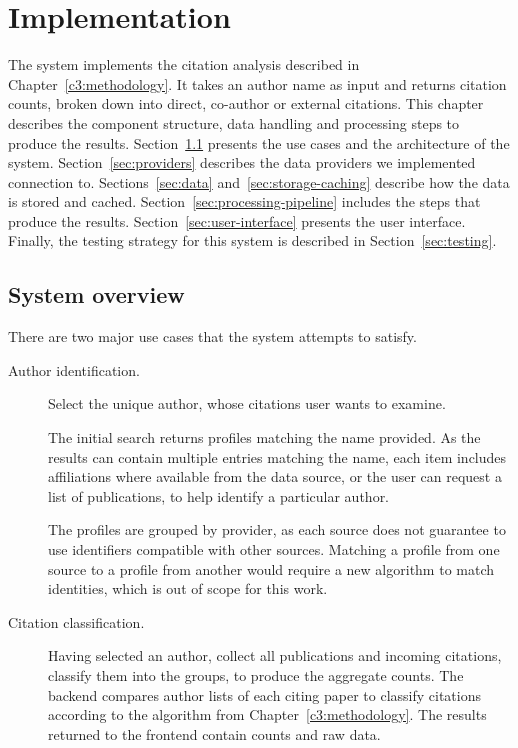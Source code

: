
\chapter{Implementation} \label{c4:implementation}

The system implements the citation analysis described in Chapter~\ref{c3:methodology}.
It takes an author name as input and returns citation counts, broken down into direct, co-author or external citations.
This chapter describes the component structure, data handling and processing steps to produce the results.
Section~\ref{sec:system-overview} presents the use cases and the architecture of the system.
Section~\ref{sec:providers} describes the data providers we implemented connection to.
Sections~\ref{sec:data} and~\ref{sec:storage-caching} describe how the data is stored and cached.
Section~\ref{sec:processing-pipeline} includes the steps that produce the results.
Section~\ref{sec:user-interface} presents the user interface.
Finally, the testing strategy for this system is described in Section~\ref{sec:testing}.

\section{System overview} \label{sec:system-overview}

There are two major use cases that the system attempts to satisfy.

\begin{description}
    \item[Author identification.] Select the unique author, whose citations user wants to examine.

    The initial search returns profiles matching the name provided.
    As the results can contain multiple entries matching the name, each item includes affiliations where available from the data source, or the user can request a list of publications, to help identify a particular author.

    The profiles are grouped by provider, as each source does not guarantee to use identifiers compatible with other sources.
    Matching a profile from one source to a profile from another would require a new algorithm to match identities, which is out of scope for this work.

    \item[Citation classification.] Having selected an author, collect all publications and incoming citations, classify them into the groups, to produce the aggregate counts.
    The backend compares author lists of each citing paper to classify citations according to the algorithm from Chapter~\ref{c3:methodology}.
    The results returned to the frontend contain counts and raw data.
\end{description}


